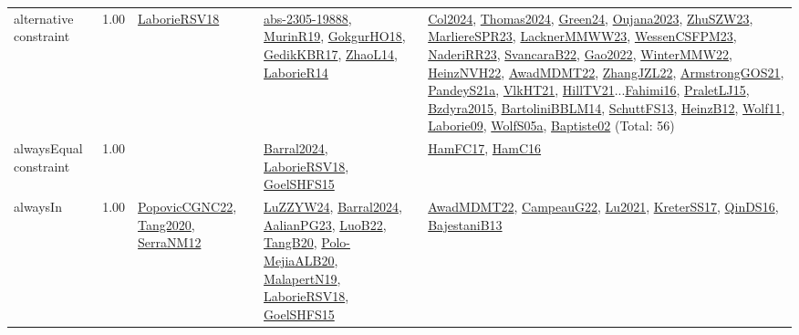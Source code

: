 {\begin{longtable}{p{3cm}r>{\raggedright\arraybackslash}p{6cm}>{\raggedright\arraybackslash}p{6cm}>{\raggedright\arraybackslash}p{8cm}}
\index{alternative constraint}\index{Constraints!alternative constraint}alternative constraint &  1.00 & \hyperref[detail:LaborieRSV18]{LaborieRSV18} & \hyperref[detail:abs-2305-19888]{abs-2305-19888}, \hyperref[detail:MurinR19]{MurinR19}, \hyperref[detail:GokgurHO18]{GokgurHO18}, \hyperref[detail:GedikKBR17]{GedikKBR17}, \hyperref[detail:ZhaoL14]{ZhaoL14}, \hyperref[detail:LaborieR14]{LaborieR14} & \hyperref[detail:Col2024]{Col2024}, \hyperref[detail:Thomas2024]{Thomas2024}, \hyperref[detail:Green24]{Green24}, \hyperref[detail:Oujana2023]{Oujana2023}, \hyperref[detail:ZhuSZW23]{ZhuSZW23}, \hyperref[detail:MarliereSPR23]{MarliereSPR23}, \hyperref[detail:LacknerMMWW23]{LacknerMMWW23}, \hyperref[detail:WessenCSFPM23]{WessenCSFPM23}, \hyperref[detail:NaderiRR23]{NaderiRR23}, \hyperref[detail:SvancaraB22]{SvancaraB22}, \hyperref[detail:Gao2022]{Gao2022}, \hyperref[detail:WinterMMW22]{WinterMMW22}, \hyperref[detail:HeinzNVH22]{HeinzNVH22}, \hyperref[detail:AwadMDMT22]{AwadMDMT22}, \hyperref[detail:ZhangJZL22]{ZhangJZL22}, \hyperref[detail:ArmstrongGOS21]{ArmstrongGOS21}, \hyperref[detail:PandeyS21a]{PandeyS21a}, \hyperref[detail:VlkHT21]{VlkHT21}, \hyperref[detail:HillTV21]{HillTV21}...\hyperref[detail:Fahimi16]{Fahimi16}, \hyperref[detail:PraletLJ15]{PraletLJ15}, \hyperref[detail:Bzdyra2015]{Bzdyra2015}, \hyperref[detail:BartoliniBBLM14]{BartoliniBBLM14}, \hyperref[detail:SchuttFS13]{SchuttFS13}, \hyperref[detail:HeinzB12]{HeinzB12}, \hyperref[detail:Wolf11]{Wolf11}, \hyperref[detail:Laborie09]{Laborie09}, \hyperref[detail:WolfS05a]{WolfS05a}, \hyperref[detail:Baptiste02]{Baptiste02} (Total: 56)\\
\index{alwaysEqual constraint}\index{Constraints!alwaysEqual constraint}alwaysEqual constraint &  1.00 &  & \hyperref[detail:Barral2024]{Barral2024}, \hyperref[detail:LaborieRSV18]{LaborieRSV18}, \hyperref[detail:GoelSHFS15]{GoelSHFS15} & \hyperref[detail:HamFC17]{HamFC17}, \hyperref[detail:HamC16]{HamC16}\\
\index{alwaysIn}\index{Constraints!alwaysIn}alwaysIn &  1.00 & \hyperref[detail:PopovicCGNC22]{PopovicCGNC22}, \hyperref[detail:Tang2020]{Tang2020}, \hyperref[detail:SerraNM12]{SerraNM12} & \hyperref[detail:LuZZYW24]{LuZZYW24}, \hyperref[detail:Barral2024]{Barral2024}, \hyperref[detail:AalianPG23]{AalianPG23}, \hyperref[detail:LuoB22]{LuoB22}, \hyperref[detail:TangB20]{TangB20}, \hyperref[detail:Polo-MejiaALB20]{Polo-MejiaALB20}, \hyperref[detail:MalapertN19]{MalapertN19}, \hyperref[detail:LaborieRSV18]{LaborieRSV18}, \hyperref[detail:GoelSHFS15]{GoelSHFS15} & \hyperref[detail:AwadMDMT22]{AwadMDMT22}, \hyperref[detail:CampeauG22]{CampeauG22}, \hyperref[detail:Lu2021]{Lu2021}, \hyperref[detail:KreterSS17]{KreterSS17}, \hyperref[detail:QinDS16]{QinDS16}, \hyperref[detail:BajestaniB13]{BajestaniB13}\\

\end{longtable}}
